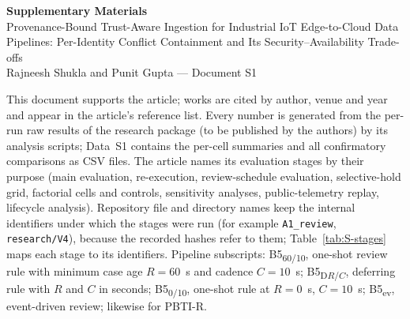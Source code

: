 \documentclass[10pt,a4paper]{article}
\begin{document}
\begin{center}
{\Large\bfseries Supplementary Materials}\\[4pt]
{\large Provenance-Bound Trust-Aware Ingestion for Industrial IoT Edge-to-Cloud Data Pipelines: Per-Identity Conflict Containment and Its Security--Availability Trade-offs}\\[4pt]
{\small Rajneesh Shukla and Punit Gupta --- Document S1}
\end{center}
\noindent This document supports the article; works are cited by author, venue and year and appear in the article's reference list. Every number is generated from the per-run raw results of the research package (to be published by the authors) by its analysis scripts; Data~S1 contains the per-cell summaries and all confirmatory comparisons as CSV files. The article names its evaluation stages by their purpose (main evaluation, re-execution, review-schedule evaluation, selective-hold grid, factorial cells and controls, sensitivity analyses, public-telemetry replay, lifecycle analysis). Repository file and directory names keep the internal identifiers under which the stages were run (for example \texttt{A1\_\allowbreak{}review}, \texttt{research/\allowbreak{}V4}), because the recorded hashes refer to them; Table~\ref{tab:S-stages} maps each stage to its identifiers. Pipeline subscripts: B5\textsubscript{60/10}, one-shot review rule with minimum case age $R=60$~s and cadence $C=10$~s; B5\textsubscript{D$R$/$C$}, deferring rule with $R$ and $C$ in seconds; B5\textsubscript{0/10}, one-shot rule at $R=0$~s, $C=10$~s; B5\textsubscript{ev}, event-driven review; likewise for PBTI-R.
\end{document}
